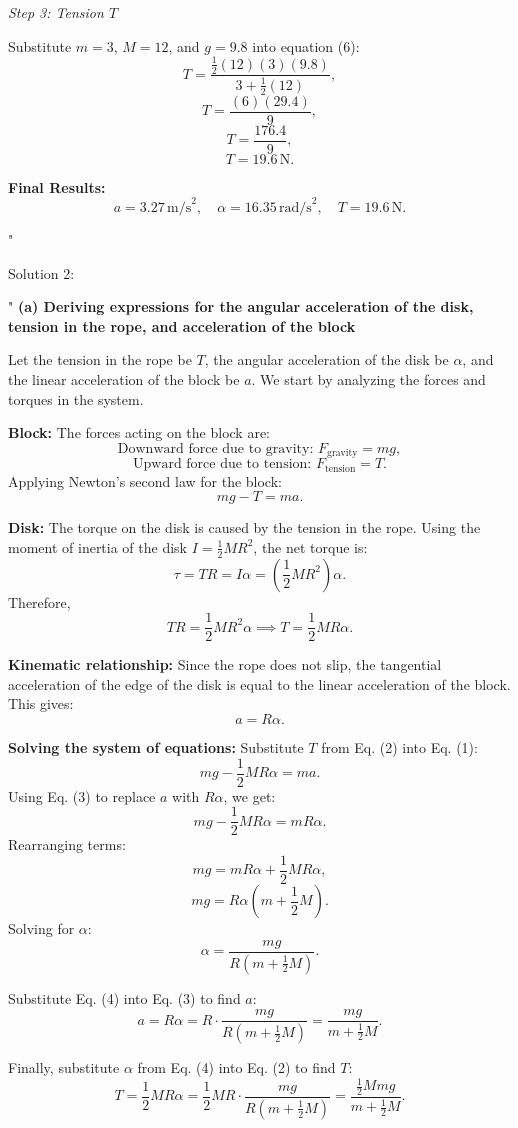 \textit{Step 3: Tension $T$}

Substitute $m = 3$, $M = 12$, and $g = 9.8$ into equation (6):
\[
T = \frac{\frac{1}{2}(12)(3)(9.8)}{3 + \frac{1}{2}(12)},
\]
\[
T = \frac{(6)(29.4)}{9},
\]
\[
T = \frac{176.4}{9},
\]
\[
T = 19.6\,\text{N}.
\]

\textbf{Final Results:}
\[
a = 3.27\,\text{m/s}^2, \quad \alpha = 16.35\,\text{rad/s}^2, \quad T = 19.6\,\text{N}.
\]

"

Solution 2: 

"
\textbf{(a) Deriving expressions for the angular acceleration of the disk, tension in the rope, and acceleration of the block}

Let the tension in the rope be $T$, the angular acceleration of the disk be $\alpha$, and the linear acceleration of the block be $a$. We start by analyzing the forces and torques in the system.

\textbf{Block:}
The forces acting on the block are:
\[
\text{Downward force due to gravity: } F_{\text{gravity}} = mg,
\]
\[
\text{Upward force due to tension: } F_{\text{tension}} = T.
\]
Applying Newton's second law for the block:
\[
mg - T = ma \tag{1}.
\]

\textbf{Disk:}
The torque on the disk is caused by the tension in the rope. Using the moment of inertia of the disk $I = \frac{1}{2} M R^2$, the net torque is:
\[
\tau = T R = I \alpha = \left(\frac{1}{2} M R^2\right) \alpha. 
\]
Therefore,
\[
T R = \frac{1}{2} M R^2 \alpha \implies T = \frac{1}{2} M R \alpha \tag{2}.
\]

\textbf{Kinematic relationship:}
Since the rope does not slip, the tangential acceleration of the edge of the disk is equal to the linear acceleration of the block. This gives:
\[
a = R \alpha \tag{3}.
\]

\textbf{Solving the system of equations:}
Substitute $T$ from Eq. (2) into Eq. (1):
\[
mg - \frac{1}{2} M R \alpha = ma.
\]
Using Eq. (3) to replace $a$ with $R \alpha$, we get:
\[
mg - \frac{1}{2} M R \alpha = m R \alpha.
\]
Rearranging terms:
\[
mg = m R \alpha + \frac{1}{2} M R \alpha,
\]
\[
mg = R \alpha \left(m + \frac{1}{2} M\right).
\]
Solving for $\alpha$:
\[
\alpha = \frac{mg}{R \left(m + \frac{1}{2} M\right)} \tag{4}.
\]

Substitute Eq. (4) into Eq. (3) to find $a$:
\[
a = R \alpha = R \cdot \frac{mg}{R \left(m + \frac{1}{2} M\right)} = \frac{mg}{m + \frac{1}{2} M} \tag{5}.
\]

Finally, substitute $\alpha$ from Eq. (4) into Eq. (2) to find $T$:
\[
T = \frac{1}{2} M R \alpha = \frac{1}{2} M R \cdot \frac{mg}{R \left(m + \frac{1}{2} M\right)} = \frac{\frac{1}{2} M m g}{m + \frac{1}{2} M} \tag{6}.
\]

